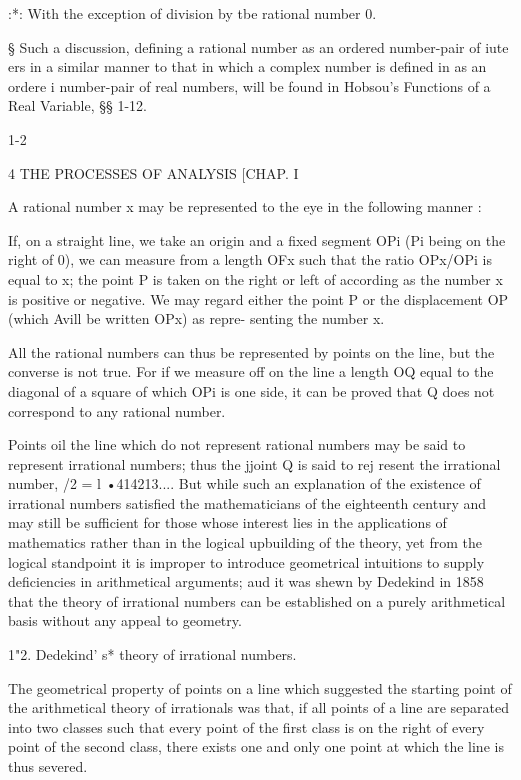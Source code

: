:*: With the exception of division by tbe rational number 0.

§ Such a discussion, defining a rational number as an ordered
number-pair of iute ers in a similar manner to that in which a complex
number is defined in as an ordere i number-pair of real numbers,
will be found in Hobsou's Functions of a Real Variable, §§ 1-12.

1-2

4 THE PROCESSES OF ANALYSIS [CHAP. I

A rational number x may be represented to the eye in the following
manner :

If, on a straight line, we take an origin and a fixed segment OPi (Pi
being on the right of 0), we can measure from a length OFx such that
the ratio OPx/OPi is equal to x; the point P is taken on the right or
left of according as the number x is positive or negative. We may
regard either the point P or the displacement OP (which Avill be
written OPx) as repre- senting the number x.

All the rational numbers can thus be represented by points on the
line, but the converse is not true. For if we measure off on the line
a length OQ equal to the diagonal of a square of which OPi is one
side, it can be proved that Q does not correspond to any rational
number.

Points oil the line which do not represent rational numbers may be
said to represent irrational numbers; thus the jjoint Q is said to
rej resent the irrational number, /2 = l •414213.... But while such
an explanation of the existence of irrational numbers satisfied the
mathematicians of the eighteenth century and may still be sufficient
for those whose interest lies in the applications of mathematics
rather than in the logical upbuilding of the theory, yet from the
logical standpoint it is improper to introduce geometrical intuitions
to supply deficiencies in arithmetical arguments; aud it was shewn by
Dedekind in 1858 that the theory of irrational numbers can be
established on a purely arithmetical basis without any appeal to
geometry.

1"2. Dedekind' s* theory of irrational numbers.

The geometrical property of points on a line which suggested the
starting point of the arithmetical theory of irrationals was that, if
all points of a line are separated into two classes such that every
point of the first class is on the right of every point of the second
class, there exists one and only one point at which the line is thus
severed.

